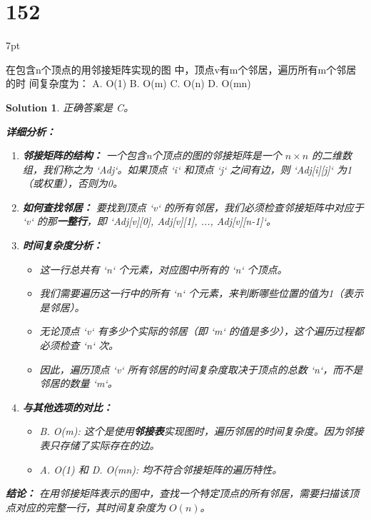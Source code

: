 \documentclass[UTF8]{report}
\newtheorem{solution}{Solution}
\theoremstyle{MyLineTheoremStyle} %
\theoremstyle{MyBlockTheoremStyle} %
\theoremstyle{MySubsubsectionStyle} %
\newenvironment{graybox}{%
        \def\FrameCommand{%
        \hspace{1pt}%
        {\color{gray}\small \vrule width 2pt}%
        {\color{graybox_color}\vrule width 4pt}%
        \colorbox{graybox_color}%
        }%
        \MakeFramed{\advance\hsize-\width\FrameRestore}%
        \noindent\hspace{-4.55pt}%
        \begin{adjustwidth}{}{7pt}%
        \vspace{2pt}\vspace{2pt}%
        }
        {%
        \vspace{2pt}\end{adjustwidth}\endMakeFramed%
        }
\begin{document}
\section*{152}
\begin{graybox}
在包含n个顶点的用邻接矩阵实现的图
中，顶点v有m个邻居，遍历所有m个邻居的时
间复杂度为：
A. O(1)
B. O(m)
C. O(n)
D. O(mn)
\end{graybox}

\begin{solution}
正确答案是 C。

\textbf{详细分析：}

\begin{enumerate}
    \item \textbf{邻接矩阵的结构：}
    一个包含n个顶点的图的邻接矩阵是一个 $n \times n$ 的二维数组，我们称之为 `Adj`。如果顶点 `i` 和顶点 `j` 之间有边，则 `Adj[i][j]` 为1（或权重），否则为0。

    \item \textbf{如何查找邻居：}
    要找到顶点 `v` 的所有邻居，我们必须检查邻接矩阵中对应于 `v` 的那\textbf{一整行}，即 `Adj[v][0], Adj[v][1], ..., Adj[v][n-1]`。

    \item \textbf{时间复杂度分析：}
    \begin{itemize}
        \item 这一行总共有 `n` 个元素，对应图中所有的 `n` 个顶点。
        \item 我们需要遍历这一行中的所有 `n` 个元素，来判断哪些位置的值为1（表示是邻居）。
        \item 无论顶点 `v` 有多少个实际的邻居（即 `m` 的值是多少），这个遍历过程都必须检查 `n` 次。
        \item 因此，遍历顶点 `v` 所有邻居的时间复杂度取决于顶点的总数 `n`，而不是邻居的数量 `m`。
    \end{itemize}

    \item \textbf{与其他选项的对比：}
    \begin{itemize}
        \item B. O(m): 这个是使用\textbf{邻接表}实现图时，遍历邻居的时间复杂度。因为邻接表只存储了实际存在的边。
        \item A. O(1) 和 D. O(mn): 均不符合邻接矩阵的遍历特性。
    \end{itemize}
\end{enumerate}

\textbf{结论：}
在用邻接矩阵表示的图中，查找一个特定顶点的所有邻居，需要扫描该顶点对应的完整一行，其时间复杂度为 $O(n)$。
\end{solution}
\end{document}
